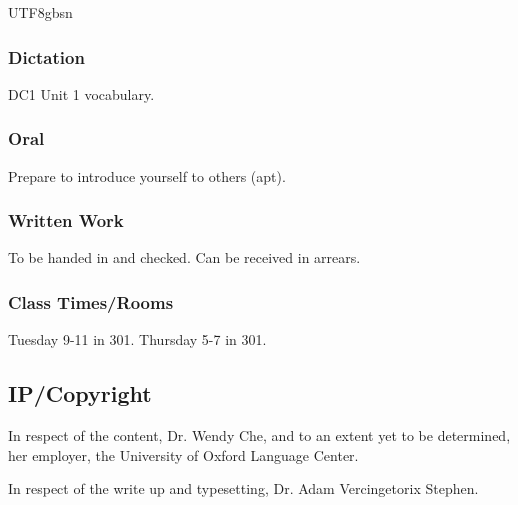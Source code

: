 \documentclass{article}
\newcommand{\myfont}{gbsn} %
\begin{document}
\begin{CJK}{UTF8}{\myfont}
\subsubsection{Dictation}

DC1 Unit 1 vocabulary.

\subsubsection{Oral}

Prepare to introduce yourself to others (apt).

\subsubsection{Written Work}

To be handed in and checked.  Can be received in arrears.

\subsubsection{Class Times/Rooms}

Tuesday 9-11 in 301.  Thursday 5-7 in 301.

\subsection{IP/Copyright}

In respect of the content, Dr. Wendy Che, and to an extent yet to be determined, her employer, the University of Oxford Language Center.

In respect of the write up and typesetting, Dr. Adam Vercingetorix Stephen.


\end{CJK} 
\end{document}
